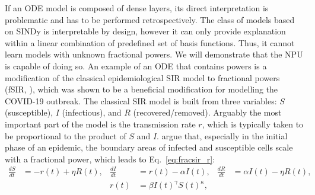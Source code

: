 \documentclass[9pt]{article}
\begin{document}
If an ODE model is composed of dense layers, its direct interpretation is
problematic and has to be performed retrospectively. The class of models based on
SINDy is interpretable by design, however it can only provide explanation
within a linear combination of predefined set of basis functions. Thus, it
cannot learn models with unknown fractional powers. We will demonstrate that the NPU
is capable of doing so.
An example of an ODE that contains powers is a modification of the classical
epidemiological SIR model \citep{kermack1927contribution} to fractional powers
(fSIR, \cite{taghvaei_fractional_2020}), which was shown to be a beneficial
modification for modelling the COVID-19 outbreak.  The classical SIR model is
built from three variables: $S$ (susceptible), $I$ (infectious), and $R$
(recovered/removed).  Arguably the most important part of the model is the
transmission rate $r$, which is typically taken to be proportional to the
product of $S$ and $I$.  \citet{taghvaei_fractional_2020} argue that,
especially in the initial phase of an epidemic, the boundary areas of infected
and susceptible cells scale with a fractional power, which leads to
Eq.~\ref{eq:fracsir_r}:
\begin{align}
  \label{eq:fracsir}
  \frac{dS}{dt} &= -r(t) + \eta R(t), &
  \frac{dI}{dt} &=  r(t) - \alpha I(t), &
  \frac{dR}{dt} &= \alpha I(t) - \eta R(t),\\
  \label{eq:fracsir_r}
  & & r(t) &= \beta I(t)^\gamma S(t)^\kappa,
\end{align}
\end{document}
